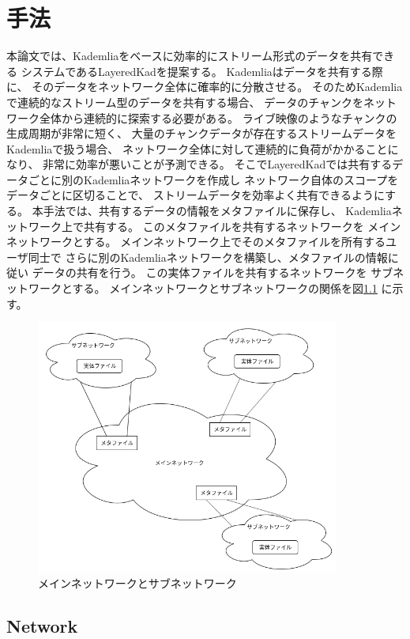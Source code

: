 \documentclass[sotsuron]{jcsie}
\begin{document}
\chapter{手法}
本論文では、Kademliaをベースに効率的にストリーム形式のデータを共有できる
システムであるLayeredKadを提案する。
Kademliaはデータを共有する際に、
そのデータをネットワーク全体に確率的に分散させる。
そのためKademliaで連続的なストリーム型のデータを共有する場合、
データのチャンクをネットワーク全体から連続的に探索する必要がある。
ライブ映像のようなチャンクの生成周期が非常に短く、
大量のチャンクデータが存在するストリームデータを
Kademliaで扱う場合、
ネットワーク全体に対して連続的に負荷がかかることになり、
非常に効率が悪いことが予測できる。
そこでLayeredKadでは共有するデータごとに別のKademliaネットワークを作成し
ネットワーク自体のスコープをデータごとに区切ることで、
ストリームデータを効率よく共有できるようにする。
本手法では、共有するデータの情報をメタファイルに保存し、
Kademliaネットワーク上で共有する。
このメタファイルを共有するネットワークを
メインネットワークとする。
メインネットワーク上でそのメタファイルを所有するユーザ同士で
さらに別のKademliaネットワークを構築し、メタファイルの情報に従い
データの共有を行う。
この実体ファイルを共有するネットワークを
サブネットワークとする。
メインネットワークとサブネットワークの関係を図\ref{fig:image}
に示す。

\begin{figure}[H]
	\centering
	\includegraphics[width=10cm]{./assets/image/image.png}
	\caption{メインネットワークとサブネットワーク}
	\label{fig:image}
\end{figure}

\section{Network}
\end{document}
